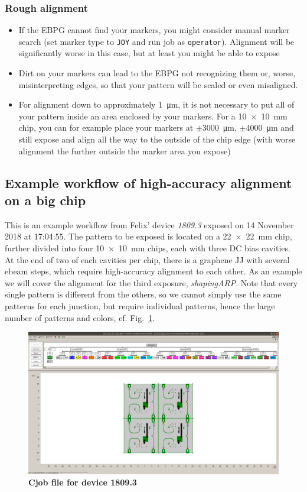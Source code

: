 \subsubsection{Rough alignment}
\begin{itemize}
	\item If the EBPG cannot find your markers, you might consider manual marker search (set marker type to \lstinline|JOY| and run job as \lstinline|operator|). 
	Alignment will be significantly worse in this case, but at least you might be able to expose
	\item Dirt on your markers can lead to the EBPG not recognizing them or, worse, misinterpreting edges, so that your pattern will be scaled or even misaligned.
	\item For alignment down to approximately \SI{1}{\micro\meter}, it is not necessary to put all of your pattern inside an area enclosed by your markers. 
	For a \SI{10x10}{\milli\meter} chip, you can for example place your markers at $\pm$\SI{3000}{\micro\meter}, $\pm$\SI{4000}{\micro\meter} and still expose and align all the way to the outside of the chip edge (with worse alignment the further outside the marker area you expose)
\end{itemize}

\subsection{Example workflow of high-accuracy alignment on a big chip}
%
This is an example workflow from Felix' device \textit{1809.3} exposed on 14 November 2018 at 17:04:55.
%
The pattern to be exposed is located on a \SI{22x22}{\milli\meter} chip, further divided into four \SI{10x10}{\milli\meter} chips, each with three DC bias cavities. 
%
At the end of two of each cavities per chip, there is a graphene JJ with several ebeam steps, which require high-accuracy alignment to each other. 
%
As an example we will cover the alignment for the third exposure, \textit{shapingARP}. 
%
Note that every single pattern is different from the others, so we cannot simply use the same patterns for each junction, but require individual patterns, hence the large number of patterns and colors, cf. Fig.~\ref{fig:ebeam1}.

\begin{figure}
	\centering
	\includegraphics[width=\linewidth]{appendix/figs/ebeam1}
	\caption{
	\textbf{Cjob file for device 1809.3}
	}
	\label{fig:ebeam1}
\end{figure}


